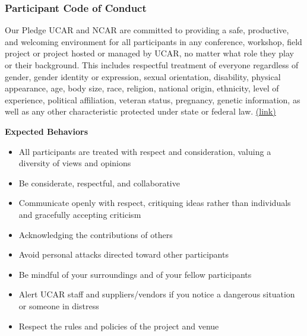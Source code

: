 \begin{frame}
  \frametitle{Participant Code of Conduct}
    \begin{block}{Our Pledge}
      UCAR and NCAR are committed to providing a safe, productive, and welcoming environment for all
      participants in any conference, workshop, field project or project hosted or managed by UCAR, no
      matter what role they play or their background. This includes respectful treatment of everyone
      regardless of gender, gender identity or expression, sexual orientation, disability, physical
      appearance, age, body size, race, religion, national origin, ethnicity, level of experience, political
      affiliation, veteran status, pregnancy, genetic information, as well as any other characteristic
      protected under state or federal law. \href{https://www.ucar.edu/who-we-are/ethics-integrity/codes-conduct/participants}{(link)}
    \end{block}

    \vspace{2em}
    \textbf{Expected Behaviors}
    \begin{itemize}
    \item All participants are treated with respect and consideration, valuing a diversity of views and opinions
    \item Be considerate, respectful, and collaborative
    \item Communicate openly with respect, critiquing ideas rather than individuals and gracefully accepting criticism
    \item Acknowledging the contributions of others
    \item Avoid personal attacks directed toward other participants
    \item Be mindful of your surroundings and of your fellow participants
    \item Alert UCAR staff and suppliers/vendors if you notice a dangerous situation or someone in distress
    \item Respect the rules and policies of the project and venue
    \end{itemize}

\end{frame}
